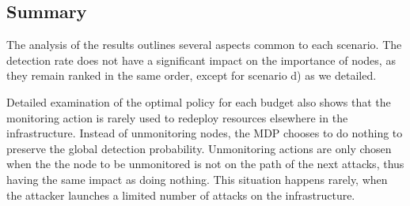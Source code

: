 
\subsection{Summary}

The analysis of the results outlines several aspects common to each scenario.
The detection rate does not have a significant impact on the importance of nodes, as they remain ranked in the same order, except for scenario d) as we detailed.

Detailed examination of the optimal policy for each budget also shows that the monitoring action is rarely used to redeploy resources elsewhere in the infrastructure.
Instead of unmonitoring nodes, the MDP chooses to do nothing to preserve the global detection probability.
Unmonitoring actions are only chosen when the the node to be unmonitored is not on the path of the next attacks, thus having the same impact as doing nothing. 
This situation happens rarely, when the attacker launches a limited number of attacks on the infrastructure.

% 
% 

